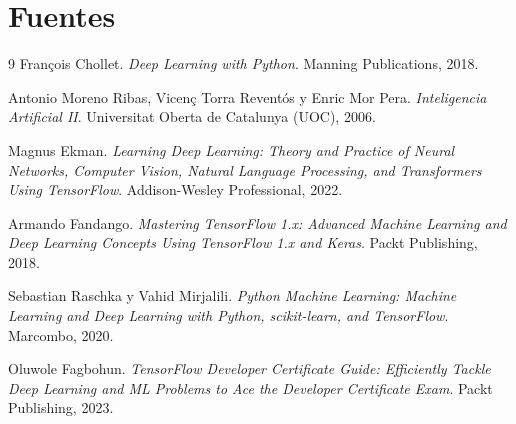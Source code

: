 \documentclass[12pt]{article}
\begin{document}
\section{Fuentes}
\begin{thebibliography}{9}
François Chollet.
\textit{Deep Learning with Python}.
Manning Publications, 2018.

Antonio Moreno Ribas, Vicenç Torra Reventós y Enric Mor Pera.
\textit{Inteligencia Artificial II}.
Universitat Oberta de Catalunya (UOC), 2006.

Magnus Ekman.
\textit{Learning Deep Learning: Theory and Practice of Neural Networks, Computer Vision, Natural Language Processing, and Transformers Using TensorFlow}.
Addison-Wesley Professional, 2022.

Armando Fandango.
\textit{Mastering TensorFlow 1.x: Advanced Machine Learning and Deep Learning Concepts Using TensorFlow 1.x and Keras}.
Packt Publishing, 2018.

Sebastian Raschka y Vahid Mirjalili.
\textit{Python Machine Learning: Machine Learning and Deep Learning with Python, scikit-learn, and TensorFlow}.
Marcombo, 2020.

Oluwole Fagbohun.
\textit{TensorFlow Developer Certificate Guide: Efficiently Tackle Deep Learning and ML Problems to Ace the Developer Certificate Exam}.
Packt Publishing, 2023.
\end{thebibliography}
\end{document}
